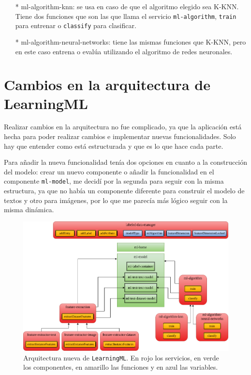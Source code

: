 \documentclass[a4paper, 12pt]{book}
\begin{document}
\begin{itemize}
	\begin{itemize}
		\item[*] ml-algorithm-knn: se usa en caso de que el algoritmo elegido sea K-KNN. 
		Tiene dos funciones que son las que llama el servicio \texttt{ml-algorithm}, \texttt{train} para entrenar o \texttt{classify} para clasificar.
		\item[*] ml-algorithm-neural-networks: tiene las mismas funciones que K-KNN, pero en este caso entrena o evalúa utilizando el algoritmo de redes neuronales.
	\end{itemize}
\end{itemize}

\section{Cambios en la arquitectura de LearningML} 
\label{sec:arquitectura nueva}

Realizar cambios en la arquitectura no fue complicado, ya que la aplicación está hecha para poder realizar cambios e implementar nuevas funcionalidades. 
Solo hay que entender como está estructurada y que es lo que hace cada parte.

Para añadir la nueva funcionalidad tenía dos opciones en cuanto a la construcción del modelo: crear un nuevo componente o añadir la funcionalidad en el componente \texttt{ml-model}, me decidí por la segunda para seguir con la misma estructura, ya que no había un componente diferente para construir el modelo de textos y otro para imágenes, por lo que me parecía más lógico seguir con la misma dinámica.

\begin{figure}[b!]
	\centering 
	\includegraphics[width=13cm, keepaspectratio]{img/arquitectura_nueva.png}
	\caption{Arquitectura nueva de \texttt{LearningML}. En rojo los servicios, en verde los componentes, en amarillo las funciones y en azul las variables.} \label{fig:arquitectura_nueva}
\end{figure}
\end{document}
